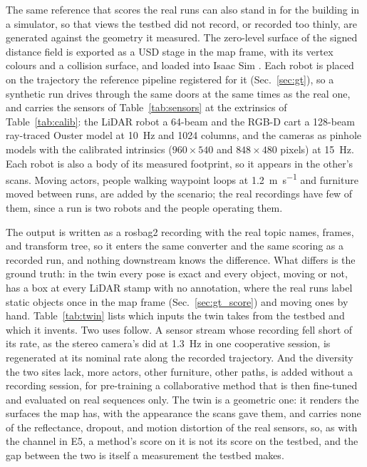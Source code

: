 The same reference that scores the real runs can also stand in for the
building in a simulator, so that views the testbed did not record, or
recorded too thinly, are generated against the geometry it measured.
The zero-level surface of the signed distance field is exported as a
USD stage in the map frame, with its vertex colours and a collision
surface, and loaded into Isaac Sim \cite{isaacsim}. Each robot is
placed on the trajectory the reference pipeline registered for it
(Sec.~\ref{sec:gt}), so a synthetic run drives through the same doors at
the same times as the real one, and carries the sensors of
Table~\ref{tab:sensors} at the extrinsics of
Table~\ref{tab:calib}: the LiDAR robot a 64-beam and the RGB-D cart a
128-beam ray-traced Ouster model at \SI{10}{\hertz} and 1024 columns,
and the cameras as pinhole models with the calibrated intrinsics
($960\times540$ and $848\times480$ pixels) at \SI{15}{\hertz}. Each robot
is also a body of its measured footprint, so it appears in the other's
scans. Moving actors, people walking waypoint loops at
\SI{1.2}{\metre\per\second} and furniture moved between runs, are
added by the scenario; the real recordings have few of them, since
a run is two robots and the people operating them.

The output is written as a rosbag2 recording with the real topic names,
frames, and transform tree, so it enters the same converter and the same
scoring as a recorded run, and nothing downstream knows the difference.
What differs is the ground truth: in the twin every pose is exact and
every object, moving or not, has a box at every LiDAR stamp with no
annotation, where the real runs label static objects once in the map
frame (Sec.~\ref{sec:gt_score}) and moving ones by hand. Table~\ref{tab:twin}
lists which inputs the twin takes from the testbed and which it
invents. Two uses follow. A sensor stream whose recording fell short of
its rate, as the stereo camera's did at \SI{1.3}{\hertz} in one
cooperative session, is regenerated at its nominal rate along the
recorded trajectory. And the diversity the two sites lack, more actors,
other furniture, other paths, is added without a recording session, for
pre-training a collaborative method that is then fine-tuned and
evaluated on real sequences only. The twin is a geometric one: it
renders the surfaces the map has, with the appearance the scans gave
them, and carries none of the reflectance, dropout, and motion
distortion of the real sensors, so, as with the channel in E5, a
method's score on it is not its score on the testbed, and the gap
between the two is itself a measurement the testbed makes.

